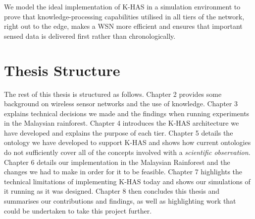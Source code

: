 We model the ideal implementation of K-HAS in a simulation environment to prove that knowledge-processing capabilities utilised in all tiers of the network, right out to the edge, makes a WSN more efficient and ensures that important sensed data is delivered first rather than chronologically.


\section{Thesis Structure}
The rest of this thesis is structured as follows. Chapter 2 provides some background on wireless sensor networks and the use of knowledge. Chapter 3 explains technical decisions we made and the findings when running experiments in the Malaysian rainforest. Chapter 4 introduces the K-HAS architecture we have developed and explains the purpose of each tier. Chapter 5 details the ontology we have developed to support K-HAS and shows how current ontologies do not sufficiently cover all of the concepts involved with a \textit{scientific observation}. Chapter 6 details our implementation in the Malaysian Rainforest and the changes we had to make in order for it to be feasible. Chapter 7 highlights the technical limitations of implementing K-HAS today and shows our simulations of it running as it was designed. Chapter 8 then concludes this thesis and summarises our contributions and findings, as well as highlighting work that could be undertaken to take this project further.